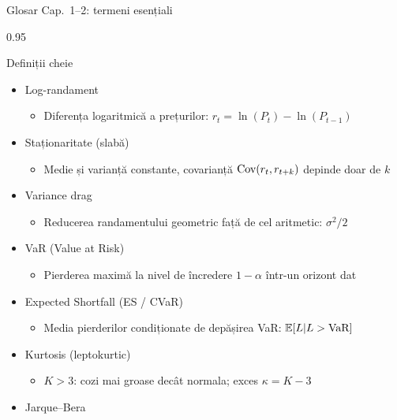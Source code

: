 \documentclass[9pt, aspectratio=169, t]{beamer}
\begin{document}

\begin{frame}[shrink=25]{Glosar Cap.~1--2: termeni esențiali}
\begin{cminipage}{0.95\textwidth}
\begin{block}{Definiții cheie}
\begin{itemize}\setlength{\itemsep}{0pt}
    \item Log-randament
    \begin{itemize}\setlength{\itemsep}{0pt}
        \item Diferența logaritmică a prețurilor: $r_t = \ln(P_t) - \ln(P_{t-1})$
    \end{itemize}
    \item Staționaritate (slabă)
    \begin{itemize}\setlength{\itemsep}{0pt}
        \item Medie și varianță constante, covarianță $\text{Cov}(r_t, r_{t+k})$ depinde doar de $k$
    \end{itemize}
    \item Variance drag
    \begin{itemize}\setlength{\itemsep}{0pt}
        \item Reducerea randamentului geometric față de cel aritmetic: $\sigma^2/2$
    \end{itemize}
    \item VaR (Value at Risk)
    \begin{itemize}\setlength{\itemsep}{0pt}
        \item Pierderea maximă la nivel de încredere $1 - \alpha$ într-un orizont dat
    \end{itemize}
    \item Expected Shortfall (ES / CVaR)
    \begin{itemize}\setlength{\itemsep}{0pt}
        \item Media pierderilor condiționate de depășirea VaR: $\mathbb{E}[L | L > \text{VaR}]$
    \end{itemize}
    \item Kurtosis (leptokurtic)
    \begin{itemize}\setlength{\itemsep}{0pt}
        \item $K > 3$: cozi mai groase decât normala; exces $\kappa = K - 3$
    \end{itemize}
    \item Jarque--Bera

\end{itemize}
\end{block}
\end{cminipage}
\end{frame}
\end{document}
